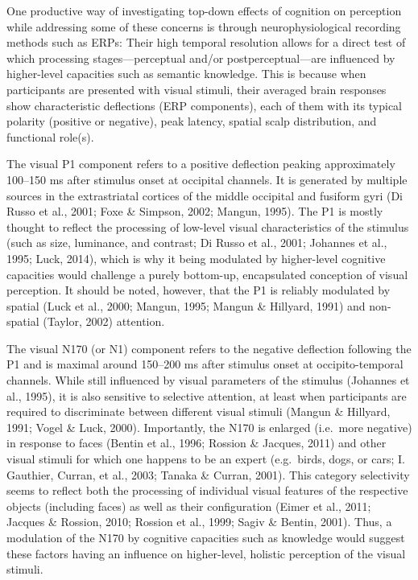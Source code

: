 \documentclass[
  english,
  man,11pt,floatsintext]{apa7}
\begin{document}
One productive way of investigating top-down effects of cognition on perception while addressing some of these concerns is through neurophysiological recording methods such as ERPs: Their high temporal resolution allows for a direct test of which processing stages---perceptual and/or postperceptual---are influenced by higher-level capacities such as semantic knowledge. This is because when participants are presented with visual stimuli, their averaged brain responses show characteristic deflections (ERP components), each of them with its typical polarity (positive or negative), peak latency, spatial scalp distribution, and functional role(s).

The visual P1 component refers to a positive deflection peaking approximately 100--150 ms after stimulus onset at occipital channels. It is generated by multiple sources in the extrastriatal cortices of the middle occipital and fusiform gyri (Di Russo et al., 2001; Foxe \& Simpson, 2002; Mangun, 1995). The P1 is mostly thought to reflect the processing of low-level visual characteristics of the stimulus (such as size, luminance, and contrast; Di Russo et al., 2001; Johannes et al., 1995; Luck, 2014), which is why it being modulated by higher-level cognitive capacities would challenge a purely bottom-up, encapsulated conception of visual perception. It should be noted, however, that the P1 is reliably modulated by spatial (Luck et al., 2000; Mangun, 1995; Mangun \& Hillyard, 1991) and non-spatial (Taylor, 2002) attention.

The visual N170 (or N1) component refers to the negative deflection following the P1 and is maximal around 150--200 ms after stimulus onset at occipito-temporal channels. While still influenced by visual parameters of the stimulus (Johannes et al., 1995), it is also sensitive to selective attention, at least when participants are required to discriminate between different visual stimuli (Mangun \& Hillyard, 1991; Vogel \& Luck, 2000). Importantly, the N170 is enlarged (i.e.~more negative) in response to faces (Bentin et al., 1996; Rossion \& Jacques, 2011) and other visual stimuli for which one happens to be an expert (e.g.~birds, dogs, or cars; I. Gauthier, Curran, et al., 2003; Tanaka \& Curran, 2001). This category selectivity seems to reflect both the processing of individual visual features of the respective objects (including faces) as well as their configuration (Eimer et al., 2011; Jacques \& Rossion, 2010; Rossion et al., 1999; Sagiv \& Bentin, 2001). Thus, a modulation of the N170 by cognitive capacities such as knowledge would suggest these factors having an influence on higher-level, holistic perception of the visual stimuli.
\end{document}
